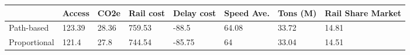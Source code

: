 \begin{tabular}{llllllll}
& Access & CO2e & Rail cost & Delay cost & Speed Ave. & Tons (M) & Rail Share Market \\ 
\hline 
Path-based & 123.39 & 28.36 & 759.53 & -88.5 & 64.08 & 33.72 & 14.81 \\ 
Proportional & 121.4 & 27.8 & 744.54 & -85.75 & 64 & 33.04 & 14.51 \\ 
\hline 
\end{tabular}